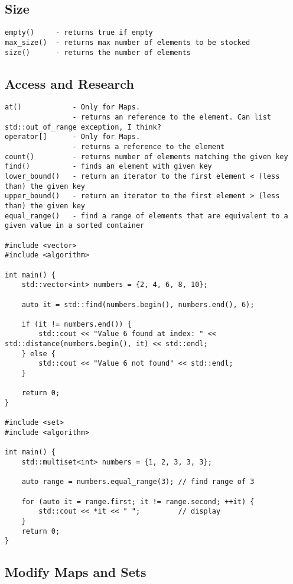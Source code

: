 \documentclass[openany]{report}
\begin{document}
\subsection{Size}

\begin{verbatim}
empty()     - returns true if empty
max_size()  - returns max number of elements to be stocked
size()      - returns the number of elements
\end{verbatim}

\subsection{Access and Research}

\begin{verbatim}
at()            - Only for Maps.
                - returns an reference to the element. Can list std::out_of_range exception, I think? 
operator[]      - Only for Maps.
                - returns a reference to the element
count()         - returns number of elements matching the given key
find()          - finds an element with given key
lower_bound()   - return an iterator to the first element < (less than) the given key
upper_bound()   - return an iterator to the first element > (less than) the given key
equal_range()   - find a range of elements that are equivalent to a given value in a sorted container

#include <vector>
#include <algorithm>

int main() {
    std::vector<int> numbers = {2, 4, 6, 8, 10};

    auto it = std::find(numbers.begin(), numbers.end(), 6);

    if (it != numbers.end()) {
        std::cout << "Value 6 found at index: " << std::distance(numbers.begin(), it) << std::endl;
    } else {
        std::cout << "Value 6 not found" << std::endl;
    }

    return 0;
}

#include <set>
#include <algorithm>

int main() {
    std::multiset<int> numbers = {1, 2, 3, 3, 3};

    auto range = numbers.equal_range(3); // find range of 3

    for (auto it = range.first; it != range.second; ++it) {
        std::cout << *it << " ";         // display
    }
    return 0;
}
\end{verbatim}

\subsection{Modify Maps and Sets}
\end{document}
